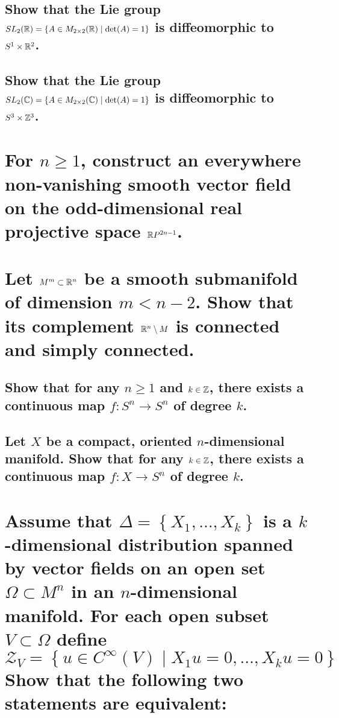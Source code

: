 \documentclass[10pt]{article}
\begin{document}
 

\advsection{}

\subsection{Show that the Lie group $SL_2(\mathbb{R}) = \left\{ A \in M_{2 \times2}(\mathbb{R})
    \mid\det (A) = 1 \right\} $ is diffeomorphic to $S^1 \times \mathbb{R}^2$.}

\subsection{Show that the Lie group $SL_2(\mathbb{C}) = \left\{ A \in M_{2 \times 2} (\mathbb{C})
    \mid \det (A)= 1 \right\} $ is diffeomorphic to $S^3 \times \mathbb{Z}^3$.}

\section{For $n \geq 1 $, construct an everywhere non-vanishing smooth vector field on the
  odd-dimensional real projective space $\mathbb{R} P^{2n-1}$.}

\section{Let $M^m \subset \mathbb{R}^n$ be a smooth submanifold of dimension $m < n-2$. Show that
  its complement $\mathbb{R}^n \setminus M$ is connected and simply connected.}

\advsection{}

\subsection{Show that for any $n \geq 1$ and $k \in \mathbb{Z}$, there exists a continuous map $f:
  S^n \to S^n$ of degree $k$.}

\subsection{Let $X$ be a compact, oriented $n$-dimensional manifold. Show that for any $k \in \mathbb{Z}$, there
  exists a continuous map $f : X \to S^n$ of degree $k$.}

\section{Assume that $\Delta = \left\{ X_1, \dots, X_k \right\} $ is a $k$-dimensional distribution
  spanned by vector fields on an open set $\Omega \subset M^n$ in an $n$-dimensional manifold. For
  each open subset $V \subset \Omega$ define
  $$ \mathcal{Z}_V = \left\{ u \in C^\infty (V) \mid X_1 u = 0, \dots, X_k u =0 \right\} $$
  Show that the following two statements are equivalent:}
\end{document}
